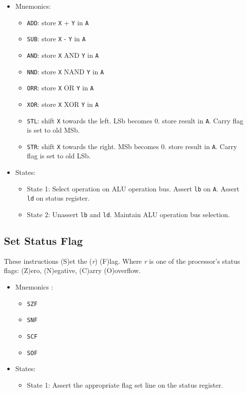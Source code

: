 \documentclass[a4paper,12pt]{article}
\newcommand{\Ar}{\texttt{A}}
\newcommand{\Xr}{\texttt{X}}
\newcommand{\Yr}{\texttt{Y}}
\newcommand\rr{\textit{r}}
\begin{document}
\begin{itemize}
\item Mnemonics:
\begin{itemize}
	\item \texttt{ADD}: store \Xr{} + \Yr{} in \Ar{}
	\item \texttt{SUB}: store \Xr{} - \Yr{} in \Ar{}
	\item \texttt{AND}: store \Xr{} AND \Yr{} in \Ar{}
	\item \texttt{NND}: store \Xr{} NAND \Yr{} in \Ar{}
	\item \texttt{ORR}: store \Xr{} OR \Yr{} in \Ar{}
	\item \texttt{XOR}: store \Xr{} XOR \Yr{} in \Ar{}
	\item \texttt{STL}: shift \Xr{} towards the left. LSb becomes 0. store
	result in \Ar{}. Carry flag is set to old MSb.
	\item \texttt{STR}: shift \Xr{} towards the right. MSb becomes 0. store
	result in \Ar{}. Carry flag is set to old LSb.
\end{itemize}
\item States: 
\begin{itemize}
	\item State 1: Select operation on ALU operation bus. Assert 
	\texttt{lb} on \Ar{}. Assert \texttt{ld} on status register.
	\item State 2: Unassert \texttt{lb} and \texttt{ld}. Maintain ALU 
	operation bus selection.
\end{itemize}
\end{itemize}

\subsection{Set Status Flag}
These instructions (S)et the (\rr{}) (F)lag. Where \rr{} is one of the
processor's status flags: (Z)ero, (N)egative, (C)arry (O)overflow.
\par

\begin{itemize}
\item Mnemonics :
\begin{itemize}
	\item \texttt{SZF}
	\item \texttt{SNF}
	\item \texttt{SCF}
	\item \texttt{SOF}
\end{itemize}
\item States:
\begin{itemize}
	\item State 1: Assert the appropriate flag set line on the status
	register.
\end{itemize}
\end{itemize}
\end{document}
